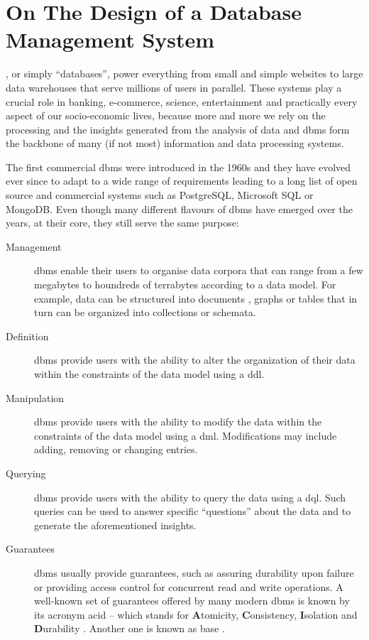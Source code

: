 \chapter{On The Design of a Database Management System}
\label{chapter:theory_databases}


, or simply ``databases'', power everything from small and simple websites to large data warehouses that serve millions of users in parallel. These systems play a crucial role in banking, e-commerce, science, entertainment and practically every aspect of our socio-economic lives, because more and more we rely on the processing and the insights generated from the analysis of data \cite{Dhar:2013Data} and \acrshort{dbms} form the backbone of many (if not most) information and data processing systems.

The first commercial \acrshort{dbms} were introduced in the 1960s \cite{Garcia:2009Database} and they have evolved ever since to adapt to a wide range of requirements leading to a long list of open source and commercial systems such as PostgreSQL, Microsoft SQL or MongoDB. Even though many different flavours of \acrshort{dbms} have emerged over the years, at their core, they still serve the same purpose:

\begin{description}
    \item[Management] \acrshort{dbms} enable their users to organise data corpora that can range from a few megabytes to houndreds of terrabytes according to a data model. For example, data can be structured into documents \cite{Hashem:2016Evaluating}, graphs \cite{Angles:2008Survey} or tables \cite{Codd:1970Relational} that in turn can be organized into collections or schemata.
    \item[Definition] \acrshort{dbms} provide users with the ability to alter the organization of their data within the constraints of the data model using a \acrfull{ddl}. 
    \item[Manipulation] \acrshort{dbms} provide users with the ability to modify the data within the constraints of the data model using a \acrfull{dml}. Modifications may include adding, removing or changing entries.
    \item[Querying] \acrshort{dbms} provide users with the ability to query the data using a \acrfull{dql}. Such queries can be used to answer specific ``questions'' about the data and to generate the aforementioned insights.
    \item[Guarantees] \acrshort{dbms} usually provide guarantees, such as assuring durability upon failure or providing access control for concurrent read and write operations. A well-known set of guarantees offered by many modern \acrshort{dbms} is known by its acronym \acrshort{acid} -- which stands for \textbf{A}tomicity, \textbf{C}onsistency, \textbf{I}solation and \textbf{D}urability \cite{Haerder:1983principles}. Another one is known as \acrshort{base} \cite{Pritchett:2008Base}.
\end{description}

